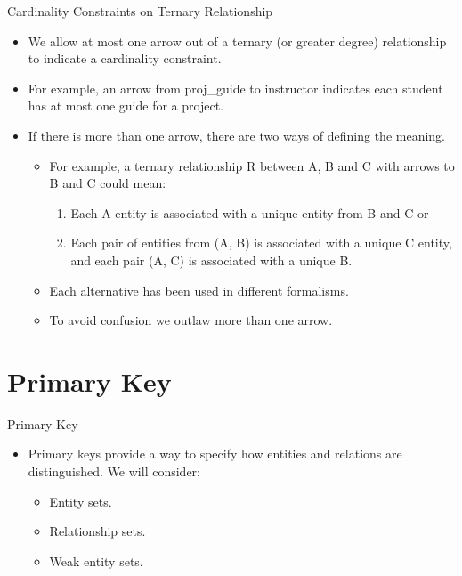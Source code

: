 \documentclass{beamer}
\begin{document}
\begin{frame}{Cardinality Constraints on Ternary Relationship}
    \begin{itemize}
        \item We allow at most one arrow out of a ternary (or greater degree) relationship to indicate a cardinality constraint.
        \item For example, an arrow from proj\_guide to instructor indicates each student has at most one guide for a project.
        \item If there is more than one arrow, there are two ways of defining the meaning.
        \begin{itemize}
            \item For example, a ternary relationship R between A, B and C with arrows to B and C could mean:
            \begin{enumerate}
                \item Each A entity is associated with a unique entity from B and C or
                \item Each pair of entities from (A, B) is associated with a unique C entity, and each pair (A, C) is associated with a unique B.
            \end{enumerate}
            \item Each alternative has been used in different formalisms.
            \item To avoid confusion we outlaw more than one arrow.
        \end{itemize}
    \end{itemize}
\end{frame}

\section{Primary Key}

\begin{frame}{Primary Key}
    \begin{itemize}
        \item Primary keys provide a way to specify how entities and relations are distinguished. We will consider:
        \begin{itemize}
            \item Entity sets.
            \item Relationship sets.
            \item Weak entity sets.
        \end{itemize}
    \end{itemize}
\end{frame}
\end{document}
